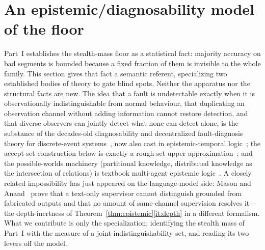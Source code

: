 \documentclass[11pt]{article}
\theoremstyle{definition}
\theoremstyle{remark}
\begin{document}
\section{An epistemic/diagnosability model of the floor}\label{sec:epistemic}
Part~I establishes the stealth-mass floor as a statistical fact: majority accuracy on bad segments is
bounded because a fixed fraction of them is invisible to the whole family.
This section gives that fact a semantic referent, specializing two established bodies of theory to
gate blind spots. Neither the apparatus nor the structural facts are new. The idea that a fault is
undetectable exactly when it is observationally indistinguishable from normal behaviour, that
duplicating an observation channel without adding information cannot restore detection, and that
diverse observers can jointly detect what none can detect alone, is the substance of the decades-old
diagnosability and decentralized fault-diagnosis theory for discrete-event
systems~\cite{sampath1995,debouk2000}, now also cast in epistemic-temporal logic~\cite{descodiag2024}; the accept-set construction below is exactly a rough-set
upper approximation~\cite{pawlak1982}; and the possible-worlds machinery (partitional knowledge,
distributed knowledge as the intersection of relations) is textbook multi-agent epistemic
logic~\cite{fagin1995,halpernmoses1990}. A closely related impossibility has just appeared on the
language-model side: Mason and Anand~\cite{masonanand2026} prove that a text-only supervisor cannot
distinguish grounded from fabricated outputs and that no amount of same-channel supervision resolves
it---the depth-inertness of Theorem~\ref{thm:epistemic}\eqref{it:depth} in a different formalism. What
we contribute is only the specialization: identifying the stealth mass of Part~I with the measure of a
joint-indistinguishability set, and reading its two levers off the model.
\end{document}
